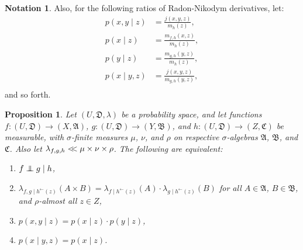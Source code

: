 \documentclass[
twoside=true,
paper=letter,
fontsize=11pt,
pagesize=auto,
leqno,
openany,
headsepline,
overfullrule,
]{scrbook}
\theoremstyle{plain}
\theoremstyle{plain}
\newtheorem{prop}[thm]{Proposition}
\theoremstyle{definition}
\newtheorem{notn}[thm]{Notation}
\theoremstyle{bfnoteitalic}
\theoremstyle{bfnoteroman}
\newcommand{\sigalg}[1]{\mathfrak{#1}}
\newcommand{\textsigma}{\hbox{\large{$\sigma$}}\kern-1pt}
\newcommand{\preimage}[1]{#1^{\leftarrow}}
\newcommand{\sigmaalgebra}{\sigalg{A}}
\newcommand{\sigmaalgebraii}{\sigalg{B}}
\newcommand{\sigmaalgebraiii}{\sigalg{C}}
\newcommand{\function}{f}
\newcommand{\functionii}{g}
\newcommand{\functioniii}{h}
\newcommand{\measurespace}{X}
\newcommand{\measurespaceii}{Y}
\newcommand{\measurespaceiii}{Z}
\newcommand{\mspaceelt}{x}
\newcommand{\mspaceeltii}{y}
\newcommand{\mspaceeltiii}{z}
\newcommand{\abscont}{\mathrel{< \kern-3.5pt <}}
\newcommand{\measure}{\mu}
\newcommand{\measureii}{\nu}
\newcommand{\measureiii}{\lambda}
\newcommand{\measureiv}{\rho}
\newcommand{\seti}{A}
\newcommand{\setii}{B}
\newcommand{\mkernel}[3]{#1_{#2\mid#3}}
\newcommand{\uspace}{U}%
\newcommand{\uspacesig}{\sigalg{D}}
\newcommand{\condindep}[3]{#1\perp\kern-6pt\perp #2\mid #3}
\begin{document}
\begin{notn}
Also, for the following ratios of Radon-Nikodym derivatives, let: 
\begin{align*}
p(\mspaceelt,\mspaceeltii\mid\mspaceeltiii) 
& = 
\frac{j(\mspaceelt,\mspaceeltii,\mspaceeltiii)}
{m_{\functioniii} (\mspaceeltiii)},
\\
p(\mspaceelt\mid\mspaceeltiii)
& =
\frac{m_{\function,\functioniii}(\mspaceelt,\mspaceeltiii)}
{m_{\functioniii} (\mspaceeltiii)},
\\
p(\mspaceeltii\mid\mspaceeltiii)
& =
\frac{m_{\functionii,\functioniii}(\mspaceeltii,\mspaceeltiii)}
{m_{\functioniii} (\mspaceeltiii)},
\\
p(\mspaceelt\mid \mspaceeltii,\mspaceeltiii)
& =
\frac{ j( \mspaceelt, \mspaceeltii, \mspaceeltiii) }
{m_{\functionii, \functioniii} ( \mspaceeltii,\mspaceeltiii ) },
\\
\end{align*}
and so forth. 
\end{notn}


\begin{prop}\label{conditional_independence_equivalence}
Let
$(\uspace,\uspacesig,\measureiii)$
be a probability space, and let functions
$\function:(\uspace,\uspacesig)\to (\measurespace,\sigmaalgebra)$,
$\functionii:(\uspace,\uspacesig)\to (\measurespaceii,\sigmaalgebraii)$,
and
$\functioniii:(\uspace,\uspacesig)\to (\measurespaceiii,\sigmaalgebraiii)$
be measurable, with \textsigma-finite measures
$\measure$, $\measureii$, and $\measureiv$ on respective \textsigma-algebras
$\sigmaalgebra$, $\sigmaalgebraii$, and $\sigmaalgebraiii$.
Also let
$\measureiii_{\function,\functionii,\functioniii}
\abscont
\measure\times\measureii\times\measureiv$.
The following are equivalent:
\begin{enumerate}
\item
$\condindep{\function}{\functionii}{\functioniii}$, 
\item
$\mkernel{\measureiii}{\function,\functionii}{\preimage{\functioniii}(\mspaceeltiii)}
(\seti\times\setii)
=
\mkernel{\measureiii}{\function}{\preimage{\functioniii}(\mspaceeltiii)}(\seti)
\cdot
\mkernel{\measureiii}{\functionii}{\preimage{\functioniii}(\mspaceeltiii)}(\setii)$
for all $\seti\in\sigmaalgebra$, $\setii\in\sigmaalgebraii$, and $\measureiv$\hyp{}almost all 
$\mspaceeltiii\in\measurespaceiii$,
\item
$p(\mspaceelt,\mspaceeltii\mid\mspaceeltiii)
= 
p(\mspaceelt\mid\mspaceeltiii)
\cdot
p(\mspaceeltii\mid\mspaceeltiii)$,
\item
$p(\mspaceelt\mid \mspaceeltii,\mspaceeltiii)
= 
p(\mspaceelt\mid\mspaceeltiii)$.
\end{enumerate}
\end{prop}
\end{document}
